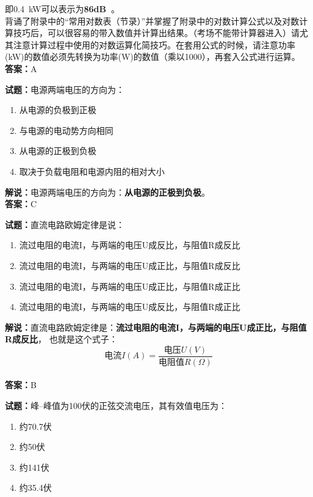 \documentclass{ctexbook}
\begin{document}
即\qty{0.4}{\kW}可以表示为\textbf{\num{86}\unit[qualifier-mode=combine]{\deci\bel{}}}。\\背诵了附录中的“常用对数表（节录）”并掌握了附录中的对数计算公式以及对数计算技巧后，可以很容易的带入数值并计算出结果。（考场不能带计算器进入）请尤其注意计算过程中使用的对数运算化简技巧。在套用公式的时候，请注意功率(\unit{\kW})的数值必须先转换为功率(\unit{\watt})的数值（乘以\num{1000}），再套入公式进行运算。\\\noindent\textbf{答案：}A

\bigskip

\noindent\textbf{试题：}电源两端电压的方向为：

\begin{enumerate}[leftmargin=3em]
  \item 从电源的负极到正极
  \item 与电源的电动势方向相同
  \item 从电源的正极到负极
  \item 取决于负载电阻和电源内阻的相对大小
\end{enumerate}

\noindent\textbf{解说：}电源两端电压的方向为：\textbf{从电源的正极到负极}。\\\noindent\textbf{答案：}C

\bigskip

\noindent\textbf{试题：}直流电路欧姆定律是说：

\begin{enumerate}[leftmargin=3em]
  \item 流过电阻的电流I，与两端的电压U成反比，与阻值R成反比
  \item 流过电阻的电流I，与两端的电压U成正比，与阻值R成反比
  \item 流过电阻的电流I，与两端的电压U成正比，与阻值R成正比
  \item 流过电阻的电流I，与两端的电压U成反比，与阻值R成正比
\end{enumerate}

\noindent\textbf{解说：}直流电路欧姆定律是：\textbf{流过电阻的电流I，与两端的电压U成正比，与阻值R成反比}，
也就是这个式子：$$\mbox{电流}I(A)=\frac{\mbox{电压}U(V)}{\mbox{电阻值}R(\Omega)}$$\\\noindent\textbf{答案：}B%

\bigskip

\noindent\textbf{试题：}峰--峰值为100伏的正弦交流电压，其有效值电压为：
\begin{enumerate}[leftmargin=3em]
  \item 约70.7伏
  \item 约50伏
  \item 约141伏
  \item 约35.4伏
\end{enumerate}
\end{document}

